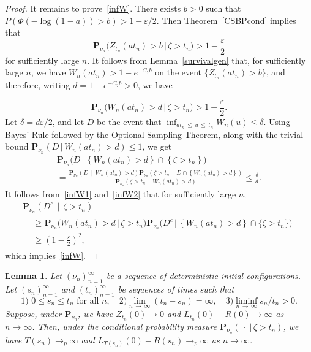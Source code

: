 \documentclass[10pt]{amsart}
\newtheorem{lemm}[theo]{Lemma}\newtheorem{prop}[theo]{Proposition}\newtheorem{coro}[theo]{Corollary}\newtheorem{conj}[theo]{Conjecture}
\theoremstyle{definition}\newtheorem{defi}[theo]{Definition}\newtheorem{rema}[theo]{Remark}\newtheorem{exam}[theo]{Example}\newtheorem{exem}[theo]{Example}\newtheorem{nota}[theo]{Notation}
\newcommand*\eps{\varepsilon}
\renewcommand*\P{\mathbf{P}}
\newcommand{\1} {\mathds{1}}
\begin{document}
\begin{proof}
It remains to prove~\eqref{infW}. There exists $b > 0$ such that $P(\Phi(-\log(1-a)) > b) > 1 - \eps/2$. Then Theorem~\ref{CSBPcond} implies that
\[
\P_{\nu_n}\big(Z_{t_n}(a t_n) > b \,\big|\, \zeta > t_n\big) > 1 - \frac{\eps}{2}
\]
for sufficiently large $n$. It follows from Lemma~\ref{survivalgen} that, for sufficiently large $n$, we have $W_n(at_n) > 1 - e^{-C_7 b}$ on the event $\{Z_{t_n}(at_n) > b\}$, and therefore, writing $d = 1 - e^{-C_7 b} > 0$, we have

\begin{equation}\label{infW1}
\P_{\nu_n}\big(W_n(at_n) > d \,\big|\, \zeta > t_n\big) > 1 - \frac{\eps}{2}.
\end{equation}
Let $\delta = d \eps/2$, and let $D$ be the event that $\inf_{at_n\,\leq\,u\,\leq\,t_n} W_n(u) \leq \delta$. Using Bayes' Rule followed by the Optional Sampling Theorem, along with the trivial bound $\P_{\nu_n}(D \,|\, W_n(at_n) > d) \leq 1$, we get
\begin{multline}\label{infW2}
\P_{\nu_n} \big(D \,\big|\, \left\{W_n(at_n) > d\right\} \cap \left\{\zeta > t_n\right\}\big)\\
= \frac{\P_{\nu_n}\left(D \,\middle|\, W_n(at_n) > d\right) \P_{\nu_n}\left(\zeta > t_n\,\middle|\, D \cap \left\{W_n(at_n) > d\right\}\right)}{\P_{\nu_n}\left(\zeta > t_n\,\middle|\,W_n(at_n) > d\right)}
\leq \frac{\delta}{d}.
\end{multline}
It follows from~\eqref{infW1} and~\eqref{infW2} that for sufficiently large $n$,
\begin{multline*}
\P_{\nu_n}\left(D^c\,\middle|\,\zeta > t_n\right)\\
\begin{aligned}
&\geq \P_{\nu_n}\big(W_n(at_n) > d\,\big|\,\zeta > t_n\big) \P_{\nu_n}\big(D^c\,\big|\,\left\{W_n(at_n) > d\right\} \cap \{\zeta > t_n\}\big) \\
&\geq \left(1 - \frac{\eps}{2} \right)^2,
\end{aligned}
\end{multline*}
which implies~\eqref{infW}.
\end{proof}

\begin{lemm}\label{gensequence}
Let $(\nu_n)_{n=1}^{\infty}$ be a sequence of deterministic initial configurations. Let $(s_n)_{n=1}^{\infty}$ and $(t_n)_{n=1}^{\infty}$ be sequences of times such that
\begin{equation}\label{sntn2}
\text{1) } 0 \leq s_n \leq t_n \text{ for all } n, \quad\text{2)} \lim_{n\,\rightarrow\, \infty} (t_n - s_n) = \infty, \quad\text{3)}\liminf_{n\,\rightarrow\,\infty} s_n/t_n > 0.
\end{equation}
Suppose, under $\P_{\nu_n}$, we have $Z_{t_n}(0) \rightarrow 0$ and $L_{t_n}(0) - R(0) \rightarrow \infty$ as $n \rightarrow \infty$. Then, under the conditional probability measure $\P_{\nu_n}(\: \cdot \:|\,\zeta > t_n)$, we have $T(s_n) \rightarrow_p \infty$ and $L_{T(s_n)}(0) - R(s_n) \rightarrow_p \infty$ as $n \rightarrow \infty$.
\end{lemm}
\end{document}
